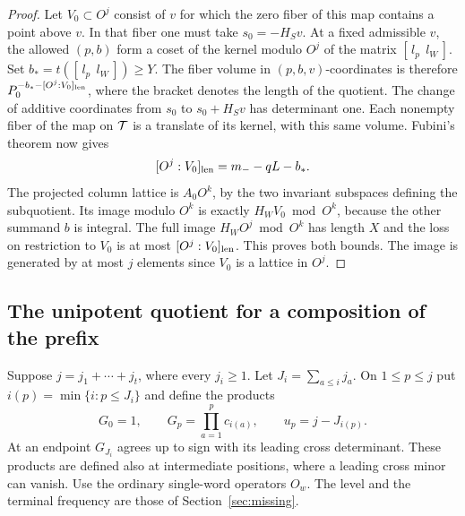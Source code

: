 \documentclass[a4paper,11pt]{article}
\theoremstyle{definition}
\theoremstyle{remark}
\numberwithin{equation}{section}
\begin{document}
\begin{proof}
Let \(V_0\subset O^j\) consist of \(v\) for which the zero
fiber of this map contains a point above \(v\). In that fiber
one must take \(s_0=-H_Sv\). At a fixed admissible \(v\),
the allowed \((p,b)\) form a coset of the kernel modulo \(O^j\)
of the matrix \([\,l_p\ \ l_W\,]\). Set
\(b_* = t([\,l_p\ \ l_W\,])\ge Y\).
The fiber volume in \((p,b,v)\)-coordinates is therefore
\(P_0^{-b_*-[O^j:V_0]_{\rm len}}\), where the bracket
denotes the length of the quotient. The change of additive
coordinates from \(s_0\) to \(s_0+H_Sv\) has determinant
one. Each nonempty fiber of the map on \({\cal T}\) is a
translate of its kernel, with this same volume. Fubini's
theorem now gives
\[
           [O^j:V_0]_{\rm len}=m_- -qL-b_*.
\]
The projected column lattice is \(A_0 O^k\), by the two
invariant subspaces defining the subquotient. Its image modulo
\(O^k\) is exactly \(H_W V_0\bmod O^k\), because the other
summand \(b\) is integral. The full image \(H_W O^j\bmod O^k\)
has length \(X\) and the loss on restriction to \(V_0\)
is at most \([O^j:V_0]_{\rm len}\). This proves both bounds.
The image is generated by at most \(j\) elements since
\(V_0\) is a lattice in \(O^j\).
\end{proof}

\subsection{The unipotent quotient for a composition of the prefix}\label{nav:IV-54}
Suppose \(j=j_1+\cdots+j_t\), where every \(j_i\ge1\).
Let \(J_i=\sum_{a\le i}j_a\). On \(1\le p\le j\) put
\(i(p)=\min\{i:p\le J_i\}\) and define the products
\[
       G_0=1,\qquad G_p=\prod_{a=1}^p c_{i(a)},\qquad
       u_p=j-J_{i(p)}.
\]
At an endpoint \(G_{J_i}\) agrees up to sign with its
leading cross determinant. These products are defined also
at intermediate positions, where a leading cross minor can vanish.
Use the ordinary single-word operators \(O_w\). The level and
the terminal frequency are those of Section~\ref{sec:missing}.
\end{document}

